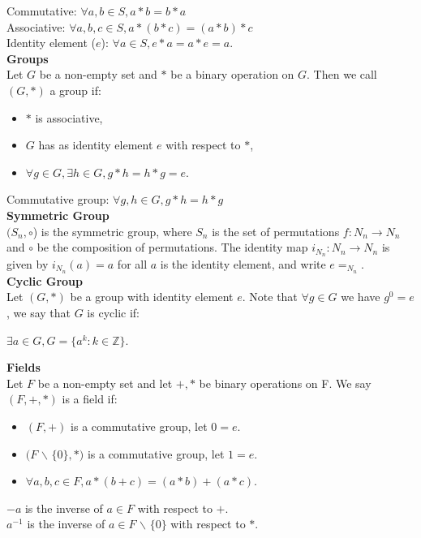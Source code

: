 \documentclass[a4paper]{article}
\begin{document}
\begin{multicols}{2}
\begin{framed}
	\noindent
	Commutative: $\forall a,b \in S, a*b = b*a$\\
	Associative: $\forall a,b,c \in S, a*(b*c) = (a*b)*c$\\
	Identity element ($e$): $\forall a \in S, e*a=a*e=a$.\\
	
	\noindent
	\textbf{Groups}\\
	Let $G$ be a non-empty set and $*$ be a binary operation on $G$. Then we call $(G,*)$ a group if:
	\begin{itemize}
		\item $*$ is associative,
		\item $G$ has as identity element $e$ with respect to $*$,
		\item $\forall g \in G, \exists h \in G, g*h=h*g=e$.
	\end{itemize}
	Commutative group: $\forall g, h \in G, g*h=h*g$\\
	
	\noindent
	\textbf{Symmetric Group}\\
	$(S_n, \circ$) is the symmetric group, where $S_n$ is the set of permutations $f: N_n \rightarrow N_n$ and $\circ$ be the composition of permutations. The identity map $i_{N_n}: N_n \rightarrow N_n$ is given by $i_{N_n}(a)=a$ for all $a$ is the identity element, and write $e=_{N_n}$.\\
	
	\noindent
	\textbf{Cyclic Group}\\
	Let $(G,*)$ be a group with identity element $e$. Note that $\forall g \in G$ we have $g^0 = e$, we say that $G$ is cyclic if:
	\begin{center}
		$\exists a \in G, G = \{a^k:k\in \mathbb{Z}\}$.
	\end{center}
	
	\noindent
	\textbf{Fields}\\
	Let $F$ be a non-empty set and let $+, *$ be binary operations on F. We say $(F,+,*)$ is a field if:
	\begin{itemize}
		\item $(F,+)$ is a commutative group, let $0 = e$.
		\item $(F$ $\backslash$ $\{0\},*)$ is a commutative group, let $1 = e$.
		\item $\forall a,b,c \in F, a*(b+c) = (a*b)+(a*c)$.
	\end{itemize}
	$-a$ is the inverse of $a \in F$ with respect to $+$.\\
	$a^{-1}$ is the inverse of $a \in F$ $\backslash$ $\{0\}$ with respect to $*$.
\end{framed}

\end{multicols}
\end{document}
